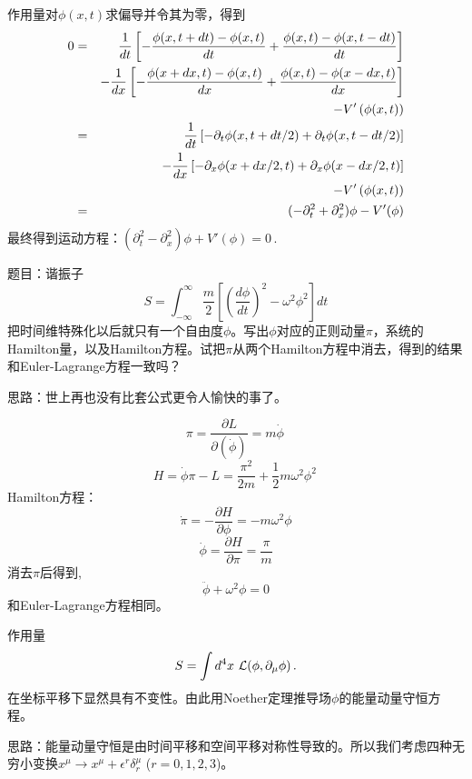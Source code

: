 \documentclass[CJK]{beamer}
\begin{document}
\begin{frame}
\bch
作用量对$\phi(x, t)$求偏导并令其为零，得到
\begin{eqnarray}
0 &=& \frac{1}{dt} \left [ -\frac{\phi(x, t+dt) - \phi(x,t)}{dt} + \frac{\phi(x, t) - \phi(x,t-dt)}{dt}\right]  \nonumber \\
  && -\frac{1}{dx}\left [- \frac{\phi(x+dx, t) - \phi(x,t)}{dx} + \frac{\phi(x, t) - \phi(x-dx,t)}{dx}\right] \nonumber \\
  && -V'\left(\phi(x, t)\right) \nonumber \\ 
  &=& \frac{1}{dt}\left[-\partial_t\phi(x, t+dt/2) + \partial_t\phi(x, t-dt/2)\right] \nonumber \\
   &&- \frac{1}{dx}\left[-\partial_x\phi(x+dx/2, t) + \partial_x\phi(x-dx/2, t)\right] \nonumber \\
   &&-  V'\left(\phi(x, t)\right)  \nonumber \\
  &=& (- \partial_t^2 + \partial_x^2 )\phi - V'(\phi) \nonumber 
\end{eqnarray}
最终得到运动方程：$(\partial_t^2 - \partial_x^2 )\phi + V'(\phi) = 0 \,.$
\ech
\end{frame}


\begin{frame}
\bch
题目：谐振子
$$ S = \int_{-\infty}^\infty \frac{m}{2}\left[(\frac{d\phi}{dt})^2 - \omega^2\phi^2\right] dt$$
把时间维特殊化以后就只有一个自由度$\phi$。写出$\phi$对应的正则动量$\pi$，系统的Hamilton量，以及Hamilton方程。试把$\pi$从两个Hamilton方程中消去，得到的结果和Euler-Lagrange方程一致吗？

\skipline
思路：世上再也没有比套公式更令人愉快的事了。
\ech
\end{frame}

\begin{frame}
\bch
$$\pi = \frac{\partial L}{\partial (\dot\phi)} = m\dot\phi \, $$
$$ H = \dot\phi \pi - L = \frac{\pi^2}{2m} +  \frac{1}{2}m\omega^2\phi^2 \, $$
Hamilton方程：
$$\dot\pi = -\frac{\partial H}{\partial\phi} = - m\omega^2\phi$$  
$$\dot\phi = \frac{\partial H}{\partial \pi} = \frac{\pi}{m} $$
消去$\pi$后得到,
$$\ddot\phi + \omega^2\phi = 0$$
和Euler-Lagrange方程相同。
\ech
\end{frame}

\begin{frame}
\bch
作用量
$$S = \int d^4x\ {\mathcal{L}}(\phi, \partial_\mu\phi)\,.$$
在坐标平移下显然具有不变性。由此用Noether定理推导场$\phi$的能量动量守恒方程。

\skipline

思路：能量动量守恒是由时间平移和空间平移对称性导致的。所以我们考虑四种无穷小变换$x^\mu \rightarrow x^\mu + \epsilon^r \delta_r^\mu$ ($r = 0, 1, 2, 3$)。
\ech
\end{frame}
\end{document}
